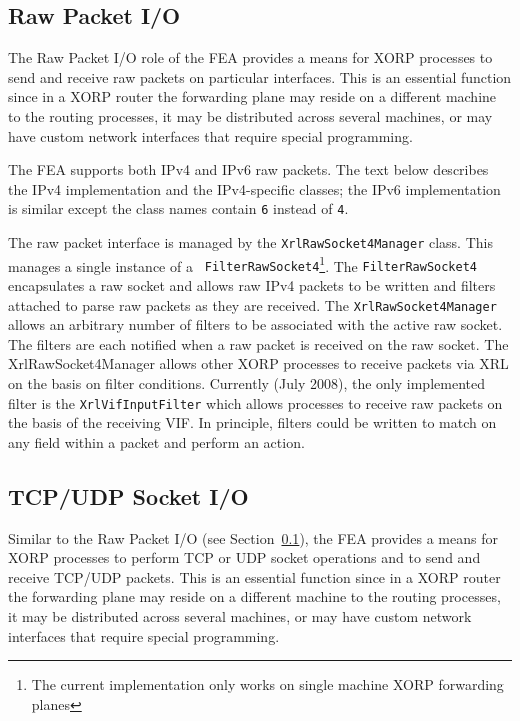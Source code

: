 \documentclass[11pt]{article}
\begin{document}
\subsection{Raw Packet I/O}
\label{sec:design:raw_packet_io}

The Raw Packet I/O role of the FEA provides a means for
XORP processes to send and receive raw packets on particular interfaces.
This is an essential function since in a XORP router the forwarding
plane may reside on a different machine to the routing processes, it
may be distributed across several machines, or may have custom network
interfaces that require special programming.

The FEA supports both IPv4 and IPv6 raw packets.
The text below describes the IPv4 implementation and the IPv4-specific
classes; the IPv6 implementation is similar except the class names
contain {\tt 6} instead of {\tt 4}.

The raw packet interface is managed by the {\tt XrlRawSocket4Manager}
class.  This manages a single instance of a {\tt
FilterRawSocket4}\footnote{The current implementation only works on
single machine XORP forwarding planes}.  The {\tt FilterRawSocket4}
encapsulates a raw socket and allows raw IPv4 packets to be written
and filters attached to parse raw packets as they are received.  The
{\tt XrlRawSocket4Manager} allows an arbitrary number of filters to be
associated with the active raw socket.  The filters are each notified
when a raw packet is received on the raw socket.  The
XrlRawSocket4Manager allows other XORP processes to receive packets
via XRL on the basis on filter conditions.  Currently (July 2008),
the only implemented filter is the {\tt XrlVifInputFilter} which
allows processes to receive raw packets on the basis of the receiving
VIF.  In principle, filters could be written to match on any field
within a packet and perform an action.

\subsection{TCP/UDP Socket I/O}

Similar to the Raw Packet I/O (see
Section~\ref{sec:design:raw_packet_io}), the FEA provides a means for
XORP processes to perform TCP or UDP socket operations and to send and
receive TCP/UDP packets.
This is an essential function since in a XORP router the forwarding
plane may reside on a different machine to the routing processes, it
may be distributed across several machines, or may have custom network
interfaces that require special programming.
\end{document}
